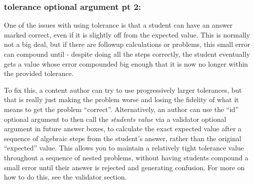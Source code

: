 \documentclass{ximera}
\begin{document}
\subsubsection*{tolerance optional argument pt 2:}
One of the issues with using tolerance is that a student can have an answer
marked correct, even if it is slightly off from the expected value. This is
normally not a big deal, but if there are followup calculations or problems,
this small error can compound until - despite doing all the steps correctly,
the student eventually gets a value whose error compounded big enough that it
is now no longer within the provided tolerance.

To fix this, a content author can try to use progressively larger
tolerances, but that is really just making the problem worse and losing the
fidelity of what it means to get the problem ``correct''. Alternatively, an
author can use the ``id'' optional argument to then call the \textit{students
  value} via a validator optional argument in future answer boxes, to calculate
the exact expected value after a sequence of algebraic steps from the student's
answer, rather than the original ``expected'' value. This allows you to
maintain a relatively tight tolerance value throughout a sequence of nested
problems, without having students compound a small error until their answer is
rejected and generating confusion. For more on how to do this, see the
validator section.
\end{document}
